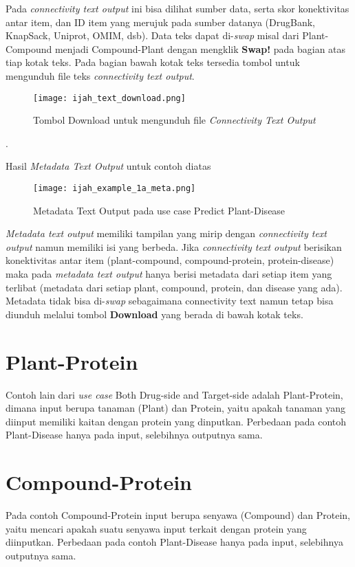 Pada \emph{connectivity text output} ini bisa dilihat sumber data, serta skor konektivitas antar item, dan ID item yang merujuk pada sumber datanya (DrugBank, KnapSack, Uniprot, OMIM, dsb). Data teks dapat di-\emph{swap} misal dari Plant-Compound menjadi Compound-Plant dengan mengklik \textbf{Swap!} pada bagian atas tiap kotak teks. Pada bagian bawah kotak teks tersedia tombol untuk mengunduh file teks \emph{connectivity text output}.

\begin{figure}[H]
	\centering
	\texttt{[image: ijah\_text\_download.png]}
	\caption{Tombol Download untuk mengunduh file \emph{Connectivity Text Output}}
	\label{fig:ijah_text_download}
\end{figure}.

Hasil \emph{Metadata Text Output} untuk contoh diatas

\begin{figure}[H]
	\centering
	\texttt{[image: ijah\_example\_1a\_meta.png]}
	\caption{Metadata Text Output pada use case Predict Plant-Disease}
	\label{fig:ijah_example_1a_meta}
\end{figure}

\emph{Metadata text output} memiliki tampilan yang mirip dengan \emph{connectivity text output} namun memiliki isi yang berbeda. Jika \emph{connectivity text output} berisikan konektivitas antar item (plant-compound, compound-protein, protein-disease) maka pada \emph{metadata text output} hanya berisi metadata dari setiap item yang terlibat (metadata dari setiap plant, compound, protein, dan disease yang ada). Metadata tidak bisa di-\emph{swap} sebagaimana connectivity text namun tetap bisa diunduh melalui tombol \textbf{Download} yang berada di bawah kotak teks.

\section{Plant-Protein}
Contoh lain dari \emph{use case} Both Drug-side and Target-side adalah Plant-Protein, dimana input berupa tanaman (Plant) dan Protein, yaitu apakah tanaman yang diinput memiliki kaitan dengan protein yang dinputkan. Perbedaan pada contoh Plant-Disease hanya pada input, selebihnya outputnya sama.

\section{Compound-Protein}
Pada contoh Compound-Protein input berupa senyawa (Compound) dan Protein, yaitu mencari apakah suatu senyawa input terkait dengan protein yang diinputkan. Perbedaan pada contoh Plant-Disease hanya pada input, selebihnya outputnya sama.

